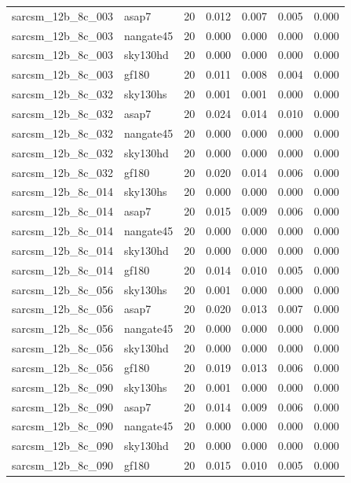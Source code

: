 \begin{tabular}{llrrrrr}
sarcsm\_12b\_8c\_003 & asap7 & 20 & 0.012 & 0.007 & 0.005 & 0.000 \\
sarcsm\_12b\_8c\_003 & nangate45 & 20 & 0.000 & 0.000 & 0.000 & 0.000 \\
sarcsm\_12b\_8c\_003 & sky130hd & 20 & 0.000 & 0.000 & 0.000 & 0.000 \\
sarcsm\_12b\_8c\_003 & gf180 & 20 & 0.011 & 0.008 & 0.004 & 0.000 \\
sarcsm\_12b\_8c\_032 & sky130hs & 20 & 0.001 & 0.001 & 0.000 & 0.000 \\
sarcsm\_12b\_8c\_032 & asap7 & 20 & 0.024 & 0.014 & 0.010 & 0.000 \\
sarcsm\_12b\_8c\_032 & nangate45 & 20 & 0.000 & 0.000 & 0.000 & 0.000 \\
sarcsm\_12b\_8c\_032 & sky130hd & 20 & 0.000 & 0.000 & 0.000 & 0.000 \\
sarcsm\_12b\_8c\_032 & gf180 & 20 & 0.020 & 0.014 & 0.006 & 0.000 \\
sarcsm\_12b\_8c\_014 & sky130hs & 20 & 0.000 & 0.000 & 0.000 & 0.000 \\
sarcsm\_12b\_8c\_014 & asap7 & 20 & 0.015 & 0.009 & 0.006 & 0.000 \\
sarcsm\_12b\_8c\_014 & nangate45 & 20 & 0.000 & 0.000 & 0.000 & 0.000 \\
sarcsm\_12b\_8c\_014 & sky130hd & 20 & 0.000 & 0.000 & 0.000 & 0.000 \\
sarcsm\_12b\_8c\_014 & gf180 & 20 & 0.014 & 0.010 & 0.005 & 0.000 \\
sarcsm\_12b\_8c\_056 & sky130hs & 20 & 0.001 & 0.000 & 0.000 & 0.000 \\
sarcsm\_12b\_8c\_056 & asap7 & 20 & 0.020 & 0.013 & 0.007 & 0.000 \\
sarcsm\_12b\_8c\_056 & nangate45 & 20 & 0.000 & 0.000 & 0.000 & 0.000 \\
sarcsm\_12b\_8c\_056 & sky130hd & 20 & 0.000 & 0.000 & 0.000 & 0.000 \\
sarcsm\_12b\_8c\_056 & gf180 & 20 & 0.019 & 0.013 & 0.006 & 0.000 \\
sarcsm\_12b\_8c\_090 & sky130hs & 20 & 0.001 & 0.000 & 0.000 & 0.000 \\
sarcsm\_12b\_8c\_090 & asap7 & 20 & 0.014 & 0.009 & 0.006 & 0.000 \\
sarcsm\_12b\_8c\_090 & nangate45 & 20 & 0.000 & 0.000 & 0.000 & 0.000 \\
sarcsm\_12b\_8c\_090 & sky130hd & 20 & 0.000 & 0.000 & 0.000 & 0.000 \\
sarcsm\_12b\_8c\_090 & gf180 & 20 & 0.015 & 0.010 & 0.005 & 0.000 \\

\end{tabular}
